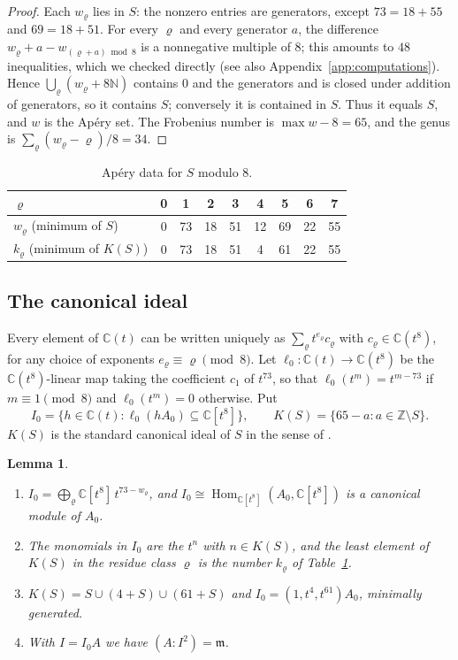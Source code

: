 \documentclass{amsart}
\newtheorem{lemma}[theorem]{Lemma}
\theoremstyle{definition}
\theoremstyle{remark}
\numberwithin{equation}{section}
\newcommand{\C}{\mathbb{C}}
\newcommand{\N}{\mathbb{N}}
\newcommand{\Z}{\mathbb{Z}}
\newcommand{\m}{\mathfrak{m}}
\DeclareMathOperator{\Hom}{Hom}
\begin{document}
\begin{proof}
Each $w_\varrho$ lies in $S$: the nonzero entries are generators, except $73=18+55$ and $69=18+51$. For every $\varrho$ and every generator $a$, the difference $w_\varrho+a-w_{(\varrho+a)\bmod 8}$ is a nonnegative multiple of $8$; this amounts to $48$ inequalities, which we checked directly (see also Appendix~\ref{app:computations}). Hence $\bigcup_\varrho(w_\varrho+8\N)$ contains $0$ and the generators and is closed under addition of generators, so it contains $S$; conversely it is contained in $S$. Thus it equals $S$, and $w$ is the Ap\'ery set. The Frobenius number is $\max w-8=65$, and the genus is $\sum_\varrho(w_\varrho-\varrho)/8=34$.
\end{proof}

\begin{table}[ht]
\caption{Ap\'ery data for $S$ modulo $8$.}\label{tab:apery}
\begin{tabular}{@{}lcccccccc@{}}
\toprule
$\varrho$ & 0 & 1 & 2 & 3 & 4 & 5 & 6 & 7\\
\midrule
$w_\varrho$ (minimum of $S$) & 0 & 73 & 18 & 51 & 12 & 69 & 22 & 55\\
$k_\varrho$ (minimum of $K(S)$) & 0 & 73 & 18 & 51 & 4 & 61 & 22 & 55\\
\bottomrule
\end{tabular}
\end{table}

\subsection{The canonical ideal}
Every element of $\C(t)$ can be written uniquely as $\sum_{\varrho}t^{e_\varrho}c_\varrho$ with $c_\varrho\in\C(t^8)$, for any choice of exponents $e_\varrho\equiv\varrho\pmod 8$. Let $\ell_0\colon\C(t)\to\C(t^8)$ be the $\C(t^8)$-linear map taking the coefficient $c_1$ of $t^{73}$, so that $\ell_0(t^m)=t^{m-73}$ if $m\equiv1\pmod 8$ and $\ell_0(t^m)=0$ otherwise. Put
\[
I_0=\{h\in\C(t):\ell_0(hA_0)\subseteq\C[t^8]\},\qquad K(S)=\{65-a:a\in\Z\setminus S\}.
\]
$K(S)$ is the standard canonical ideal of $S$ in the sense of \cite[\S 1]{DS}.

\begin{lemma}\label{lem:canonical}
\begin{enumerate}
\item $I_0=\bigoplus_\varrho\C[t^8]\,t^{73-w_\varrho}$, and $I_0\cong\Hom_{\C[t^8]}(A_0,\C[t^8])$ is a canonical module of $A_0$.
\item The monomials in $I_0$ are the $t^n$ with $n\in K(S)$, and the least element of $K(S)$ in the residue class $\varrho$ is the number $k_\varrho$ of Table~\ref{tab:apery}.
\item $K(S)=S\cup(4+S)\cup(61+S)$ and $I_0=(1,t^4,t^{61})A_0$, minimally generated.
\item With $I=I_0A$ we have $(A:I^2)=\m$.
\end{enumerate}
\end{lemma}
\end{document}
